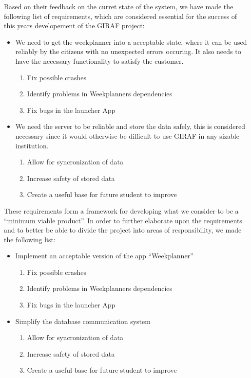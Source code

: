  Based on their feedback on the curret state
of the system, we have made the following list of requirements, which are
considered essential for the success of this years developement of the GIRAF
project:

\begin{itemize}
  \item We need to get the weekplanner into a acceptable state, where it can be
  used reliably by the citizens with no unexpected errors occuring. It also
  needs to have the necessary functionality to satisfy the customer.
    	\begin{enumerate}
  		\item Fix possible crashes
  		\item Identify problems in Weekplanners dependencies
  		\item Fix bugs in the launcher App
	\end{enumerate}
  \item We need the server to be reliable and store the data safely, this is
  considered necessary since it would otherwise be difficult to use GIRAF in any
  sizable institution.
    \begin{enumerate}
  		\item Allow for syncronization of data
  		\item Increase safety of stored data
  		\item Create a useful base for future student to improve
	\end{enumerate}
\end{itemize}

These requirements form a framework for developing what we consider to be a
``minimum viable product''. In order to further elaborate upon the requirements
and to better be able to divide the project into areas of responsibility, we
made the following list:

\begin{itemize}
  \item Implement an acceptable version of the app ``Weekplanner''
  	\begin{enumerate}
  		\item Fix possible crashes
  		\item Identify problems in Weekplanners dependencies
  		\item Fix bugs in the launcher App
	\end{enumerate}
  \item Simplify the database communication system
   	\begin{enumerate}
  		\item Allow for syncronization of data
  		\item Increase safety of stored data
  		\item Create a useful base for future student to improve
	\end{enumerate}
\end{itemize}


